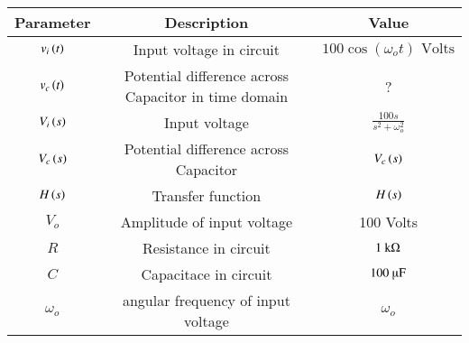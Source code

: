\begin{tabular}{|c|c|c|}
    \hline
    \textbf{Parameter} & \textbf{Description} & \textbf{Value} \\
    \hline
    $ v_i\left(t\right)$ & Input voltage in circuit & $ 100 \cos{(\omega_o t)}\text{ Volts}$ \\
    \hline
    $v_c\left(t\right)$ & Potential difference across Capacitor in time domain & ? \\
    \hline
    $V_i\left(s\right)$ & Input voltage & $ \frac{100s}{s^2+ \omega_o^2}$\\
    \hline
    $V_c\left(s\right)$ & Potential difference across Capacitor & $V_c\left(s\right)$ \\
    \hline
    $H\left(s\right)$ & Transfer function & $ H\left(s\right)$ \\
    \hline
    $ V_o$ & Amplitude of input voltage & 100 Volts\\
    \hline
    $R$ & Resistance in circuit & $ 1\text{ k\ohm}$ \\
    \hline
    $C$ & Capacitace in circuit & $ 100 \text{ \micro F}$ \\
    \hline
    $\omega_o$ & angular frequency of input voltage& $ \omega_o$\\
    \hline
\end{tabular}



